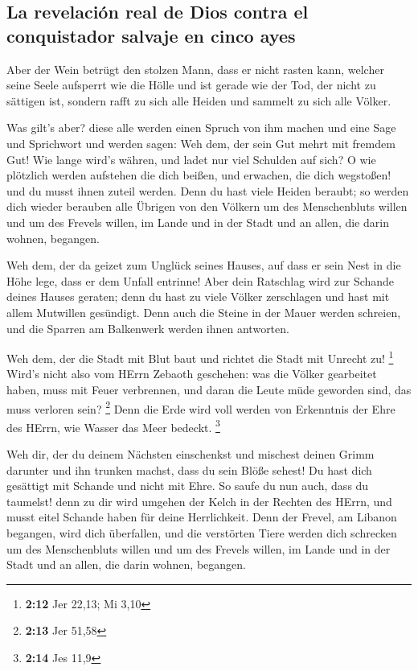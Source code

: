\hypertarget{la-revelaciuxf3n-real-de-dios-contra-el-conquistador-salvaje-en-cinco-ayes}{%
\subsection{La revelación real de Dios contra el conquistador salvaje en
cinco
ayes}\label{la-revelaciuxf3n-real-de-dios-contra-el-conquistador-salvaje-en-cinco-ayes}}

 Aber der Wein betrügt den stolzen Mann, dass er nicht
rasten kann, welcher seine Seele aufsperrt wie die Hölle und ist gerade
wie der Tod, der nicht zu sättigen ist, sondern rafft zu sich alle
Heiden und sammelt zu sich alle Völker.

 Was gilt's aber? diese alle werden einen Spruch von ihm
machen und eine Sage und Sprichwort und werden sagen: Weh dem, der sein
Gut mehrt mit fremdem Gut! Wie lange wird's währen, und ladet nur viel
Schulden auf sich?  O wie plötzlich werden aufstehen die
dich beißen, und erwachen, die dich wegstoßen! und du musst ihnen zuteil
werden.  Denn du hast viele Heiden beraubt; so werden dich
wieder berauben alle Übrigen von den Völkern um des Menschenbluts willen
und um des Frevels willen, im Lande und in der Stadt und an allen, die
darin wohnen, begangen.

 Weh dem, der da geizet zum Unglück seines Hauses, auf
dass er sein Nest in die Höhe lege, dass er dem Unfall entrinne!
 Aber dein Ratschlag wird zur Schande deines Hauses
geraten; denn du hast zu viele Völker zerschlagen und hast mit allem
Mutwillen gesündigt.  Denn auch die Steine in der Mauer
werden schreien, und die Sparren am Balkenwerk werden ihnen antworten.

 Weh dem, der die Stadt mit Blut baut und richtet die
Stadt mit Unrecht zu! \footnote{\textbf{2:12} Jer 22,13; Mi 3,10}
 Wird's nicht also vom HErrn Zebaoth geschehen: was die
Völker gearbeitet haben, muss mit Feuer verbrennen, und daran die Leute
müde geworden sind, das muss verloren sein? \footnote{\textbf{2:13} Jer
  51,58}  Denn die Erde wird voll werden von Erkenntnis
der Ehre des HErrn, wie Wasser das Meer bedeckt. \footnote{\textbf{2:14}
  Jes 11,9}

 Weh dir, der du deinem Nächsten einschenkst und mischest
deinen Grimm darunter und ihn trunken machst, dass du sein Blöße sehest!
 Du hast dich gesättigt mit Schande und nicht mit Ehre.
So saufe du nun auch, dass du taumelst! denn zu dir wird umgehen der
Kelch in der Rechten des HErrn, und musst eitel Schande haben für deine
Herrlichkeit.  Denn der Frevel, am Libanon begangen, wird
dich überfallen, und die verstörten Tiere werden dich schrecken um des
Menschenbluts willen und um des Frevels willen, im Lande und in der
Stadt und an allen, die darin wohnen, begangen.

